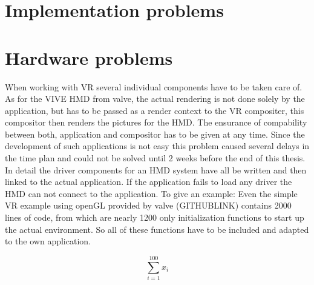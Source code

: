 \documentclass[hyperref,english,bachelorofscience,bibnum]{cgvpub}
\begin{document}
\section{Implementation problems}



\section{Hardware problems}

When working with VR several individual components have to be taken care of. As for the VIVE HMD from valve, the actual rendering is not done solely by the application, but has to be passed as a render context to the VR compositer, this compositor then renders the pictures for the HMD. The ensurance of compability between both, application and compositor has to be given at any time. Since the development of such applications is not easy this problem caused several delays in the time plan and could not be solved until 2 weeks before the end of this thesis. In detail the driver components for an HMD system have all be written and then linked to the actual application. If the application fails to load any driver the HMD can not connect to the application. To give an example: Even the simple VR example using openGL provided by valve (GITHUBLINK) contains 2000 lines of code, from which are nearly 1200 only initialization functions to start up the actual environment. So all of these functions have to be included and adapted to the own application.




\[
\sum_{i=1}^{100}x_i
\]


\cite*{}
\end{document}
